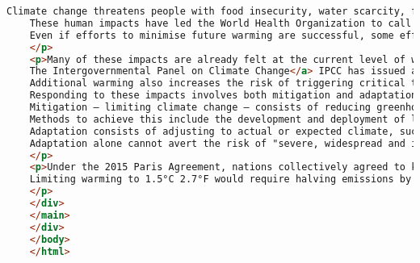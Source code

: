 \begin{lstlisting}[language=HTML,caption=Исходный код страницы Climate Change]
    Climate change threatens people with food insecurity, water scarcity, flooding, infectious diseases, extreme heat, economic losses, and displacement.
    These human impacts have led the World Health Organization to call climate change the greatest threat to global health in the 21st century.
    Even if efforts to minimise future warming are successful, some effects will continue for centuries, including rising sea levels</a>, rising ocean temperatures, and ocean acidification.
    </p>
    <p>Many of these impacts are already felt at the current level of warming, which is about 1.2°C 2.2°F.
    The Intergovernmental Panel on Climate Change</a> IPCC has issued a series of reports that project significant increases in these impacts as warming continues to 1.5°C 2.7°F and beyond.
    Additional warming also increases the risk of triggering critical thresholds called tipping points.
    Responding to these impacts involves both mitigation and adaptation.
    Mitigation – limiting climate change – consists of reducing greenhouse gas emissions and removing them from the atmosphere.
    Methods to achieve this include the development and deployment of low-carbon energy sources</a> such as wind and solar, a phase-out of coal</a>, enhanced energy efficiency, and forest preservation.
    Adaptation consists of adjusting to actual or expected climate, such as through improved coastline protection, better disaster management, and the development of more resistant crops.
    Adaptation alone cannot avert the risk of "severe, widespread and irreversible" impacts.
    </p>
    <p>Under the 2015 Paris Agreement, nations collectively agreed to keep warming "well under 2.0°C 3.6°F" through mitigation efforts. However, with pledges made under the Agreement, global warming would still reach about 2.8°C 5.0° by the end of the century.
    Limiting warming to 1.5°C 2.7°F would require halving emissions by 2030 and achieving near-zero emissions by 2050.
    </p>
    </div>
    </main>
    </div>
    </body>
    </html>

\end{lstlisting}


